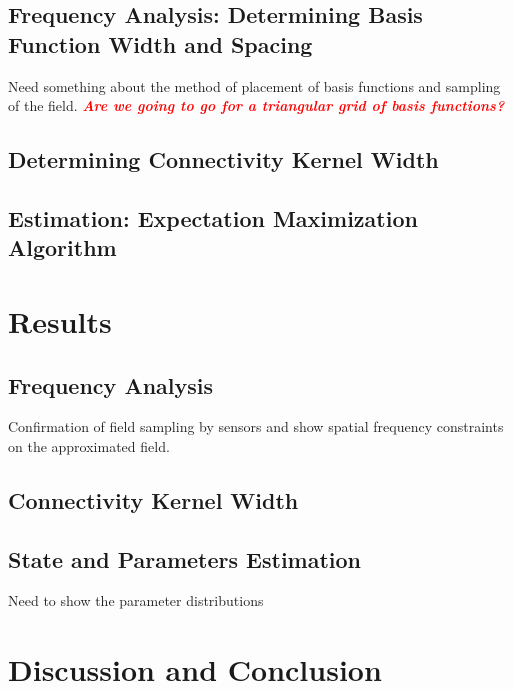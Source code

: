 \documentclass[a4paper,10pt]{article}
\newcommand{\dean}[1]{\textsf{\emph{\textbf{\textcolor{red}{#1}}}}}
\begin{document}
\subsection{Frequency Analysis: Determining Basis Function Width and Spacing}
Need something about the method of placement of basis functions and sampling of
the field. \dean{Are we going to go for a triangular grid of basis functions?}

\subsection{Determining Connectivity Kernel Width}

\subsection{Estimation: Expectation Maximization Algorithm}

\section{Results}

\subsection{Frequency Analysis}
Confirmation of field sampling by sensors and show spatial frequency constraints
on the approximated field.

\subsection{Connectivity Kernel Width}

\subsection{State and Parameters Estimation}
Need to show the parameter distributions

\section{Discussion and Conclusion}
\end{document}

